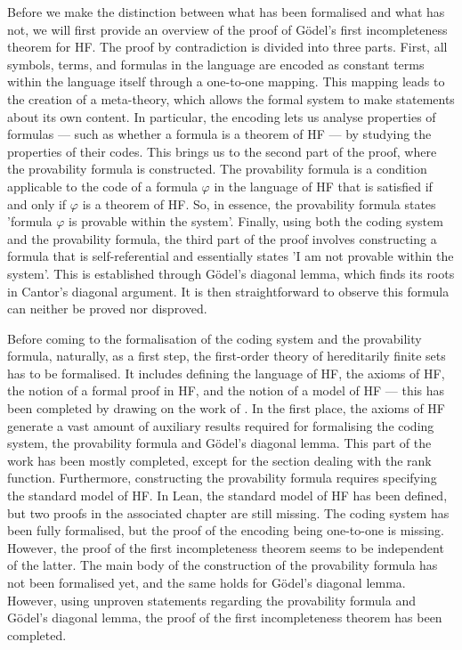 Before we make the distinction between what has been formalised and what has not,
we will first provide an overview of the proof of Gödel's first incompleteness theorem for HF.
The proof by contradiction is divided into three parts.
First, all symbols, terms, and formulas in the language are encoded as constant terms within the
language itself through a one-to-one mapping.
This mapping leads to the creation of a meta-theory, 
which allows the formal system to make statements about its own content. 
In particular, the encoding lets us analyse properties of formulas — such as whether a formula 
is a theorem of HF — by studying the properties of their codes.
This brings us to the second part of the proof, where the provability formula is constructed.
The provability formula is a condition applicable to the code of a formula $\varphi$ 
in the language of HF that is satisfied if and only if $\varphi$ is a theorem of HF.
So, in essence, the provability formula states 'formula $\varphi$ is provable within the system'.
Finally, using both the coding system and the provability formula, 
the third part of the proof involves constructing a formula that is self-referential and 
essentially states 'I am not provable within the system'. This is established through 
Gödel's diagonal lemma, which finds its roots in Cantor's diagonal argument.
It is then straightforward to observe this formula can neither be proved nor disproved.

Before coming to the formalisation of the coding system and the provability formula, naturally,
as a first step, the first-order theory of hereditarily finite sets has to be formalised.
It includes defining the language of HF, the axioms of HF, the notion of a formal proof in HF,
and the notion of a model of HF — this has been completed by drawing on the work of
\cite{han2020formal}.
In the first place, the axioms of HF generate a vast amount of auxiliary results required for 
formalising the coding system, the provability formula and Gödel's diagonal lemma. 
This part of the work has been mostly completed, 
except for the section dealing with the rank function.
Furthermore, constructing the provability formula requires specifying the standard model of HF.
In Lean, the standard model of HF has been defined, but two proofs in the associated chapter
are still missing.
The coding system has been fully formalised, but the proof of the encoding being one-to-one
is missing. However, the proof of the first incompleteness theorem seems to be independent of the
latter.
The main body of the construction of the provability formula has not been formalised yet,
and the same holds for Gödel's diagonal lemma.
However, using unproven statements regarding the provability formula and Gödel's diagonal lemma, 
the proof of the first incompleteness theorem has been completed. 

